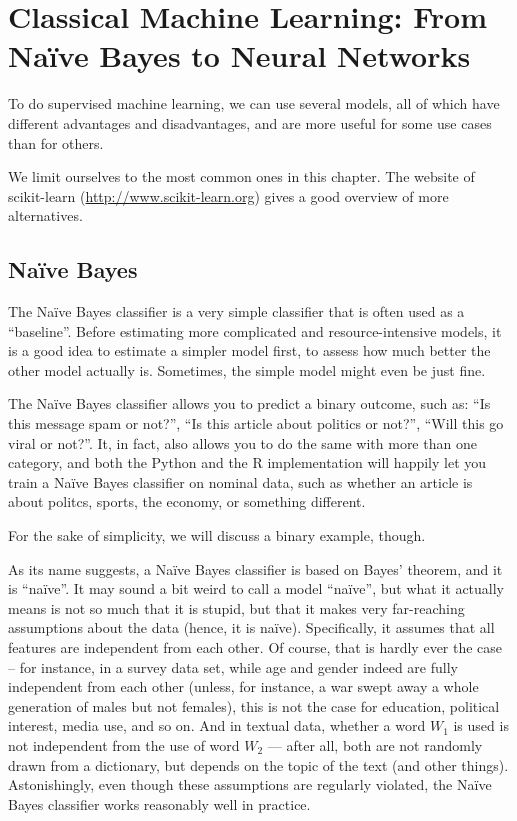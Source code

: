 \section{Classical Machine Learning: From Na\"{i}ve Bayes to Neural Networks}
\label{sec:nb2dnn}
To do supervised machine learning, we can use several models, all of
which have different advantages and disadvantages, and are more useful
for some use cases than for others.

We limit ourselves to the most common ones in this chapter. The
website of scikit-learn (\url{http://www.scikit-learn.org}) gives a
good overview of more alternatives.

\subsection{Na\"ive Bayes}
\label{subsec:Na\"ive Bayes}

The Na\"ive Bayes classifier is a very simple classifier that is often
used as a ``baseline''. Before estimating more complicated and
resource-intensive models, it is a good idea to estimate a simpler
model first, to assess how much better the other model actually
is. Sometimes, the simple model might even be just fine.

The Na\"ive Bayes classifier allows you to predict a binary outcome,
such as: ``Is this message spam or not?'', ``Is this article about
politics or not?'', ``Will this go viral or not?''.  It, in fact, also
allows you to do the same with more than one category, and both the
Python and the R implementation will happily let you train a Na\"ive
Bayes classifier on nominal data, such as whether an article is about
politcs, sports, the economy, or something different.

For the sake of simplicity, we will discuss a binary example, though.

As its name suggests, a Na\"ive Bayes classifier is based on Bayes'
theorem, and it is ``na\"ive''.  It may sound a bit weird to call a
model ``na\"ive'', but what it actually means is not so much that it
is stupid, but that it makes very far-reaching assumptions about the
data (hence, it is na\"ive). Specifically, it assumes that all
features are independent from each other.  Of course, that is hardly
ever the case -- for instance, in a survey data set, while age and
gender indeed are fully independent from each other (unless, for
instance, a war swept away a whole generation of males but not
females), this is not the case for education, political interest,
media use, and so on.  And in textual data, whether a word $W_1$ is used
is not independent from the use of word $W_2$ --- after all, both are not
randomly drawn from a dictionary, but depends on the topic of the text
(and other things).  Astonishingly, even though these assumptions are
regularly violated, the Na\"ive Bayes classifier works reasonably well
in practice.

